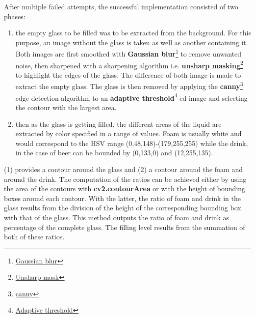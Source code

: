 \documentclass[11pt]{article}
\renewcommand{\headrulewidth}{1pt}
\begin{document}
    After multiple failed attempts, the successful implementation consisted of two phases:
    \begin{enumerate}
       \item the empty glass to be filled was to be extracted from the background.
    For this purpose, an image without the glass is taken as well as another containing it.
    Both images are first smoothed with \textbf{Gaussian blur}\footnote{\href{https://aryamansharda.medium.com/image-filters-gaussian-blur-eb36db6781b1}{Gaussian blur}} to remove unwanted noise, then sharpened with a
    sharpening algorithm i.e. \textbf{unsharp masking}\footnote{\href{https://www.cambridgeincolour.com/tutorials/unsharp-mask.htm}{Unsharp mask}} to highlight the edges of the glass.
    The difference of both image is made to extract the empty glass.
    The glass is then removed by applying the \textbf{canny}\footnote{\href{https://justin-liang.com/tutorials/canny/}{canny}} edge detection algorithm to an \textbf{adaptive threshold}\footnote{\href{https://homepages.inf.ed.ac.uk/rbf/HIPR2/adpthrsh.htm}{Adaptive threshold}}-ed
       image and selecting the contour with the largest area.
       \item then as the glass is getting filled, the different areas of the liquid are extracted by color specified in
    a range of values.
    Foam is usually white and would correspond to the HSV range (0,48,148)-(179,255,255) while the drink, in the case
    of beer can be bounded by (0,133,0) and (12,255,135).
    \end{enumerate}
    (1) provides a contour around the glass and (2) a contour around the foam and around the drink.
    The computation of the ratios can be achieved either by using the area of the contours with \textbf{cv2.contourArea}
    or with the height of bounding boxes around each contour.
    With the latter, the ratio of foam and drink in the glass results from the division of the height of the corresponding
    bounding box with that of the glass.
    This method outputs the ratio of foam and drink as percentage of the complete glass.
    The filling level results from the summation of both of these ratios.

    \fancyhead{}
    \renewcommand{\headrulewidth}{0pt}
\end{document}
